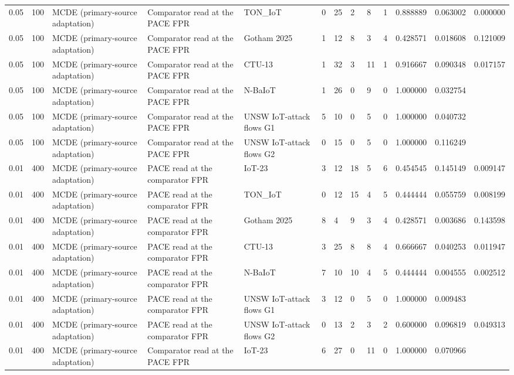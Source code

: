 \begin{tabular}{lllllllllllll}
0.05 & 100 & MCDE (primary-source adaptation) & Comparator read at the PACE FPR & TON\_IoT & 0 & 25 & 2 & 8 & 1 & 0.888889 & 0.063002 & 0.000000 \\
0.05 & 100 & MCDE (primary-source adaptation) & Comparator read at the PACE FPR & Gotham 2025 & 1 & 12 & 8 & 3 & 4 & 0.428571 & 0.018608 & 0.121009 \\
0.05 & 100 & MCDE (primary-source adaptation) & Comparator read at the PACE FPR & CTU-13 & 1 & 32 & 3 & 11 & 1 & 0.916667 & 0.090348 & 0.017157 \\
0.05 & 100 & MCDE (primary-source adaptation) & Comparator read at the PACE FPR & N-BaIoT & 1 & 26 & 0 & 9 & 0 & 1.000000 & 0.032754 &  \\
0.05 & 100 & MCDE (primary-source adaptation) & Comparator read at the PACE FPR & UNSW IoT-attack flows G1 & 5 & 10 & 0 & 5 & 0 & 1.000000 & 0.040732 &  \\
0.05 & 100 & MCDE (primary-source adaptation) & Comparator read at the PACE FPR & UNSW IoT-attack flows G2 & 0 & 15 & 0 & 5 & 0 & 1.000000 & 0.116249 &  \\
0.01 & 400 & MCDE (primary-source adaptation) & PACE read at the comparator FPR & IoT-23 & 3 & 12 & 18 & 5 & 6 & 0.454545 & 0.145149 & 0.009147 \\
0.01 & 400 & MCDE (primary-source adaptation) & PACE read at the comparator FPR & TON\_IoT & 0 & 12 & 15 & 4 & 5 & 0.444444 & 0.055759 & 0.008199 \\
0.01 & 400 & MCDE (primary-source adaptation) & PACE read at the comparator FPR & Gotham 2025 & 8 & 4 & 9 & 3 & 4 & 0.428571 & 0.003686 & 0.143598 \\
0.01 & 400 & MCDE (primary-source adaptation) & PACE read at the comparator FPR & CTU-13 & 3 & 25 & 8 & 8 & 4 & 0.666667 & 0.040253 & 0.011947 \\
0.01 & 400 & MCDE (primary-source adaptation) & PACE read at the comparator FPR & N-BaIoT & 7 & 10 & 10 & 4 & 5 & 0.444444 & 0.004555 & 0.002512 \\
0.01 & 400 & MCDE (primary-source adaptation) & PACE read at the comparator FPR & UNSW IoT-attack flows G1 & 3 & 12 & 0 & 5 & 0 & 1.000000 & 0.009483 &  \\
0.01 & 400 & MCDE (primary-source adaptation) & PACE read at the comparator FPR & UNSW IoT-attack flows G2 & 0 & 13 & 2 & 3 & 2 & 0.600000 & 0.096819 & 0.049313 \\
0.01 & 400 & MCDE (primary-source adaptation) & Comparator read at the PACE FPR & IoT-23 & 6 & 27 & 0 & 11 & 0 & 1.000000 & 0.070966 &  \\

\end{tabular}
